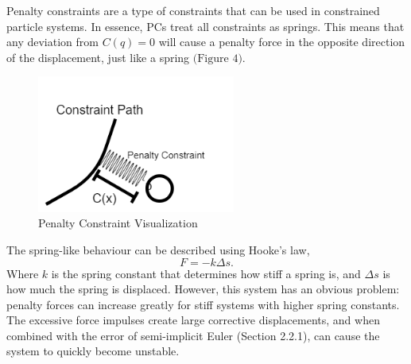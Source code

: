 \documentclass[12pt, letterpaper]{article}
\begin{document}
\hspace{\parindent} Penalty constraints are a type of constraints that can be used in constrained particle systems. In essence, PCs treat all constraints as springs. This means that any deviation from $C(q) = 0$ will cause a penalty force in the opposite direction of the displacement, just like a spring $\text{(Figure 4)}$. 
\begin{figure}[H]
\centering
\includegraphics[width=6.5cm]{pc.png}
\caption{Penalty Constraint Visualization}
\label{fig:figure}
\end{figure} 
The spring-like behaviour can be described using Hooke's law,
\begin{equation}
    F = -k \Delta s.
\end{equation}
Where $k$ is the spring constant that determines how stiff a spring is, and $\Delta s$ is how much the spring is displaced. However, this system has an obvious problem: penalty forces can increase greatly for stiff systems with higher spring constants. The excessive force impulses create large corrective displacements, and when combined with the error of semi-implicit Euler (Section 2.2.1), can cause the system to quickly become unstable. 
\end{document}
